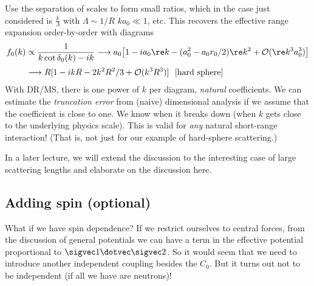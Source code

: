 \begin{enumerate}
            \bi
              \I Use the separation of scales to form small ratios, which in
              the case just considered is
                 $\frac{\textstyle{k}}{\textstyle\Lambda}$ 
                   with 
                   $\Lambda \sim 1/R$ \Lra $k a_0 \ll 1$, etc.
            \I This recovers the effective range expansion order-by-order
              with diagrams
              \begin{align}
              {f_0(k)} &\propto
                 \frac{1}{k\cot\delta_0(k) - ik}
                   \longrightarrow a_0 \bigl[ 1 - ia_0 {\re k} - (a_0^2 - a_0 r_0/2)
              {\re k^2} + {\cal O}({\re k^3} a_0^3)
              \bigr] \\[2pt]
                   & \longrightarrow R[1 - ikR - 2k^2 R^2/3 + {\cal
                   O}(k^3R^3)]
                   \ \ \mbox{[hard sphere]}
              \end{align}
              \bi
                \I With DR/MS, there is one power of $k$ per diagram, \emph{natural} coefficients.
                \I We can estimate the \emph{truncation error} from 
                (naive) dimensional analysis if we assume that the coefficient
                is close to one. 
                \I We know when it breaks down (when $k$ gets close to
                the underlying physics scale).
                \I This is valid for \emph{any} natural short-range interaction!
                (That is, not just for our example of hard-sphere scattering.)
              \ei
       
            \ei
        \end{enumerate} 
In a later lecture, we will extend the discussion to the interesting case
of large scattering lengths and elaborate on the discussion here.

\subsection{Adding spin (optional)}

What if we have spin dependence?  If we restrict ourselves to central
forces, from the discussion of general potentials we can have a term
in the effective potential proportional to $\sigvec1\dotvec \sigvec2$.
So it would seem that we need to introduce another independent coupling
besides the $C_0$. But it turns out not to be independent (if all
we have are neutrons)!

